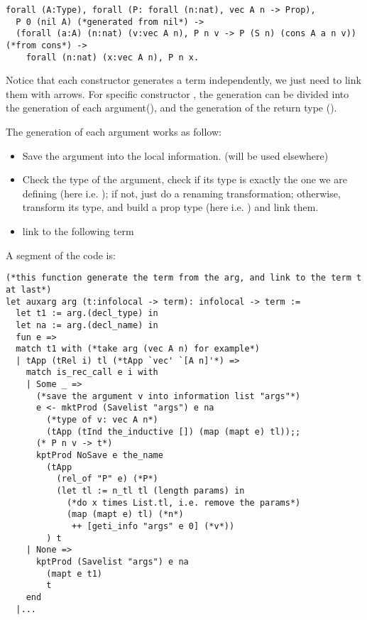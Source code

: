 \documentclass[a4paper,UKenglish,cleveref, autoref, thm-restate]{lipics-v2021}
\begin{document}
\begin{lstlisting}[language = {Coq}, basicstyle = \small]
forall (A:Type), forall (P: forall (n:nat), vec A n -> Prop),
  P 0 (nil A) (*generated from nil*) ->
  (forall (a:A) (n:nat) (v:vec A n), P n v -> P (S n) (cons A a n v)) (*from cons*) ->
    forall (n:nat) (x:vec A n), P n x.
\end{lstlisting}

Notice that each constructor generates a term independently, we just need to link them with arrows. For specific constructor , the generation can be divided into the generation of each argument(), and the generation of the return type ().

The generation of each argument works as follow:

\begin{itemize}
    \item Save the argument into the local information. (will be used elsewhere)
    \item Check the type of the argument, check if its type is exactly the one we are defining (here i.e. ); if not, just do a renaming transformation; otherwise, transform its type, and build a prop type (here i.e. ) and link them.

    \item link to the following term
\end{itemize}

A segment of the code is:

\begin{lstlisting}[language = {Coq}, basicstyle = \small]
(*this function generate the term from the arg, and link to the term t at last*)
let auxarg arg (t:infolocal -> term): infolocal -> term :=
  let t1 := arg.(decl_type) in
  let na := arg.(decl_name) in
  fun e =>
  match t1 with (*take arg (vec A n) for example*)
  | tApp (tRel i) tl (*tApp `vec' `[A n]'*) =>
    match is_rec_call e i with
    | Some _ =>
      (*save the argument v into information list "args"*)
      e <- mktProd (Savelist "args") e na
        (*type of v: vec A n*)
        (tApp (tInd the_inductive []) (map (mapt e) tl));;
      (* P n v -> t*)
      kptProd NoSave e the_name
        (tApp
          (rel_of "P" e) (*P*)
          (let tl := n_tl tl (length params) in
            (*do x times List.tl, i.e. remove the params*)
            (map (mapt e) tl) (*n*)
             ++ [geti_info "args" e 0] (*v*))
        ) t
    | None =>
      kptProd (Savelist "args") e na
        (mapt e t1)
        t
    end
  |...
\end{lstlisting}
\end{document}
